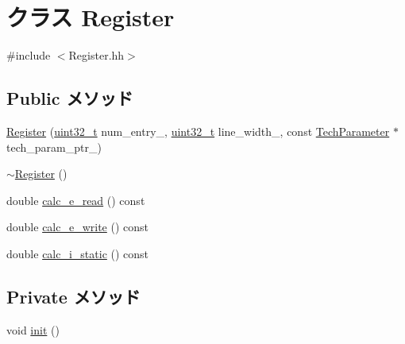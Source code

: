 \hypertarget{classRegister}{
\section{クラス Register}
\label{classRegister}
}


{\ttfamily \#include $<$Register.hh$>$}\subsection*{Public メソッド}
\begin{DoxyCompactItemize}
\item 
\hyperlink{classRegister_ace71f3ca1774db718709b5fc232f19a9}{Register} (\hyperlink{Type_8hh_a435d1572bf3f880d55459d9805097f62}{uint32\_\-t} num\_\-entry\_\-, \hyperlink{Type_8hh_a435d1572bf3f880d55459d9805097f62}{uint32\_\-t} line\_\-width\_\-, const \hyperlink{classTechParameter}{TechParameter} $\ast$tech\_\-param\_\-ptr\_\-)
\item 
\hyperlink{classRegister_a04697760fce6a4a15865313f464bb84d}{$\sim$Register} ()
\item 
double \hyperlink{classRegister_a160510652e19b516f4efd9395964bd75}{calc\_\-e\_\-read} () const 
\item 
double \hyperlink{classRegister_ae7d5598c1aa5b953a944caba3d98bdba}{calc\_\-e\_\-write} () const 
\item 
double \hyperlink{classRegister_aad1d8e72e5083614a20373b700754f6a}{calc\_\-i\_\-static} () const 
\end{DoxyCompactItemize}
\subsection*{Private メソッド}
\begin{DoxyCompactItemize}
\item 
void \hyperlink{classRegister_a02fd73d861ef2e4aabb38c0c9ff82947}{init} ()
\end{DoxyCompactItemize}
